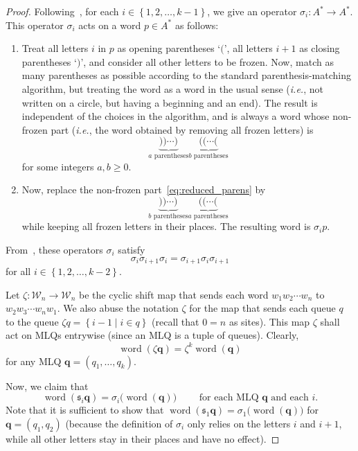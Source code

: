 \documentclass[reqno]{amsart}
\newcommand{\0}{\phantom{c}}
\DeclareMathOperator{\word}{word} %
\newcommand{\qq}{\mathbf{q}}
\newcommand{\mcW}{\mathcal{W}}
\newcommand{\fraks}{\mathfrak{s}}
\newcommand{\set}[1]{\left\{ #1 \right\}}
\newcommand{\tup}[1]{\left( #1 \right)}
\theoremstyle{plain}
\theoremstyle{definition}
\numberwithin{equation}{section}
\begin{document}
\begin{proof}
Following~\cite[\S5.5]{Loth}, for each $i \in \set{1, 2, \ldots, k-1}$, we give an operator
$\sigma_i \colon A^* \to A^*$.
This operator $\sigma_i$ acts on a word $p \in A^*$ %
as follows:
\begin{enumerate}
 \item Treat all letters $i$ in $p$ as opening parentheses `$($',
       all letters $i+1$ as closing parentheses `$)$',
       and consider all other letters to be frozen.
       Now, match as many parentheses as possible
       according to the standard parenthesis-matching algorithm,
       but treating the word as a word in the usual sense
       (\textit{i.e.}, not written on a circle, but having a beginning
       and an end).
       The result is independent of the choices in the algorithm,
       and is always a word whose non-frozen
       part (\textit{i.e.}, the word obtained by removing
       all frozen letters) is
       \[
       \label{eq:reduced_parens}
       \underbrace{))\cdots)}_{a\text{ parentheses}}
       \underbrace{((\cdots(}_{b\text{ parentheses}}
       \]
       for some integers $a, b \geq 0$.
 \item Now, replace the non-frozen part~\eqref{eq:reduced_parens} by
       \[
       \underbrace{))\cdots)}_{b\text{ parentheses}}
       \underbrace{((\cdots(}_{a\text{ parentheses}}
       \]
       while keeping all frozen letters in their places.
       The resulting word is $\sigma_i p$.
\end{enumerate}
From~\cite[Eq.~(5.6.3)]{Loth}, these operators
$\sigma_i$ satisfy
\begin{equation}
 \sigma_i \sigma_{i+1} \sigma_i
 = \sigma_{i+1} \sigma_i \sigma_{i+1}
 \label{pf.prop:braid.loth-eq}
\end{equation}
for all $i \in \set{1, 2, \ldots, k-2}$.

Let $\zeta \colon \mcW_n \to \mcW_n$ be the cyclic shift map that sends each word $w_1 w_2 \cdots w_n$ to $w_2 w_3 \cdots w_n w_1$.
We also abuse the notation $\zeta$ for the map that sends each queue $q$ to the queue $\zeta q = \set{ i - 1 \mid i \in q }$ (recall that $0 = n$ as sites).
This map $\zeta$ shall act on MLQs entrywise (since an MLQ is a tuple of queues).
Clearly,
\begin{equation}
 \word(\zeta \qq) = \zeta^k \word(\qq)
 \label{pf.prop:braid.word-zeta}
\end{equation}
for any MLQ $\qq = (q_1, \ldots, q_k)$.

Now, we claim that
\begin{equation}
 \word(\fraks_i \qq) = \sigma_i\bigl( \word(\qq) \bigr)
 \qquad \text{ for each MLQ } \qq \text{ and each } i .
 \label{pf.prop:braid.inter}
\end{equation}
Note that it is sufficient to show that $\word(\fraks_1 \qq) = \sigma_1\bigl( \word(\qq) \bigr)$ for $\qq = (q_1, q_2)$
(because the definition of $\sigma_i$ only relies on the letters $i$ and $i+1$, while all other letters stay in their places and have no effect).


\end{proof}
\end{document}
